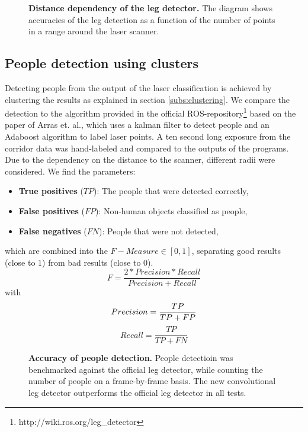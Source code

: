 \begin{figure}
	\label{fig:radius_detection}
		\normalsize
		\begin{center}
			
		\end{center}
		\caption{\textbf{Distance dependency of the leg detector.} The diagram shows accuracies of the leg detection as a function of the number of points in a range around the laser scanner.}
\end{figure}

\subsection{People detection using clusters}

Detecting people from the output of the laser classification is achieved by clustering the results as explained in section \ref{subs:clustering}. We compare the detection to the algorithm provided in the official ROS-repository\footnote{http://wiki.ros.org/leg\_detector} based on the paper of Arras et. al.\cite{Arras07usingboosted}, which uses a kalman filter to detect people and an Adaboost algorithm to label laser points. A ten second long exposure from the corridor data was hand-labeled and compared to the outputs of the programs. Due to the dependency on the distance to the scanner, different radii were considered. We find the parameters:
\begin{itemize}
	\item \textbf{True positives} ($TP$): The people that were detected correctly,
	\item \textbf{False positives} ($FP$): Non-human objects classified as people,
	\item \textbf{False negatives} ($FN$): People that were not detected,
\end{itemize}
which are combined into the $F-Measure \in \left[ 0,1 \right]$, separating good results (close to $1$) from bad results (close to $0$).
\begin{equation}
	F=\frac{2*Precision*Recall}{Precision+Recall}
\end{equation}
with
\begin{equation}
	Precision = \frac{TP}{TP + FP}\\
\end{equation}
\begin{equation}
	Recall = \frac{TP}{TP + FN}
\end{equation}

\begin{figure}
	\label{fig:people_detection}
	\normalsize
	\begin{center}
		
	\end{center}
	\caption{\textbf{Accuracy of people detection.} People detectioin was benchmarked against the official leg detector, while counting the number of people on a frame-by-frame basis. The new convolutional leg detector outperforms the official leg detector in all tests.}
\end{figure}

